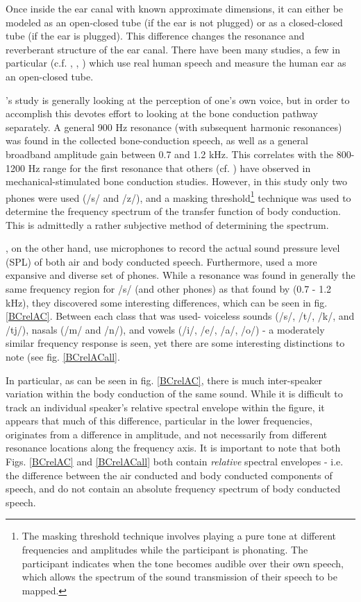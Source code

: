 \documentclass[dissertation,copyright]{uathesis}
\begin{document}

Once inside the ear canal with known approximate dimensions, it can either be modeled as an open-closed tube (if the ear is not plugged) or as a closed-closed tube (if the ear is plugged). This difference changes the resonance and reverberant structure of the ear canal.
There have been many studies, a few in particular (c.f. \cite{bekesy:48}, \cite{porschmann:00}, \cite{reinfeldt:10}) which use real human speech and measure the human ear as an open-closed tube.

\cite{porschmann:00}'s study is generally looking at the perception of one's own voice, but in order to accomplish this devotes effort to looking at the bone conduction pathway separately.  A general 900 Hz resonance (with subsequent harmonic resonances) was found in the collected bone-conduction speech, as well as a general broadband amplitude gain between 0.7 and 1.2 kHz.  This correlates with the 800-1200 Hz range for the first resonance that others  (cf. \cite{hakansson:94}) have observed in mechanical-stimulated bone conduction studies.  However, in this study only two phones were used (/s/ and /z/), and a masking threshold\footnote{The masking threshold technique involves playing a pure tone at different frequencies and amplitudes while the participant is phonating. The participant indicates when the tone becomes audible over their own speech, which allows the spectrum of the sound transmission of their speech to be mapped.} technique was used to determine the frequency spectrum of the transfer function of body conduction.  This is admittedly a rather subjective method of determining the spectrum.  

\cite{reinfeldt:10}, on the other hand, use microphones to record the actual sound pressure level (SPL) of both air and body conducted speech. Furthermore, \cite{reinfeldt:10} used a more expansive and diverse set of phones.  While a resonance was found in generally the same frequency region for /s/ (and other phones) as that found by \cite{porschmann:00} (0.7 - 1.2 kHz), they discovered some interesting differences, which can be seen in fig. \ref{BCrelAC}. Between each class that was used- voiceless sounds (/s/, /t/, /k/, and /tj/),  nasals (/m/ and /n/), and vowels (/i/, /e/, /a/, /o/) - a moderately similar frequency response is seen, yet there are some interesting distinctions to note (see fig. \ref{BCrelACall}.

In particular, as can be seen in fig. \ref{BCrelAC}, there is much inter-speaker variation within the body conduction of the same sound.  While it is difficult to track an individual speaker's relative spectral envelope within the figure, it appears that much of this difference, particular in the lower frequencies, originates from a difference in amplitude, and not necessarily from different resonance locations along the frequency axis.  It is important to note that both Figs. \ref{BCrelAC} and \ref{BCrelACall} both contain \textit{relative} spectral envelopes - i.e. the difference between the air conducted and body conducted components of speech, and do not contain an absolute frequency spectrum of body conducted speech. 
\end{document}
